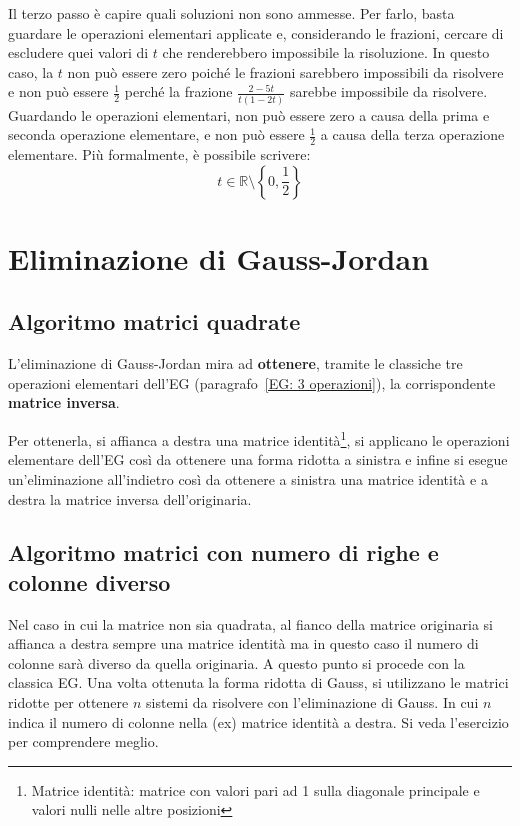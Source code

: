 \documentclass[a4paper]{article}
\begin{document}
	Il \textcolor{Red3}{terzo passo} è capire quali soluzioni non sono ammesse. Per farlo, basta guardare le operazioni elementari applicate e, considerando le frazioni, cercare di escludere quei valori di $t$ che renderebbero impossibile la risoluzione. In questo caso, la $t$ non può essere zero poiché le frazioni sarebbero impossibili da risolvere e non può essere $\frac{1}{2}$ perché la frazione $\frac{2-5t}{t\left(1-2t\right)}$ sarebbe impossibile da risolvere. Guardando le operazioni elementari, non può essere zero a causa della prima e seconda operazione elementare, e non può essere $\frac{1}{2}$ a causa della terza operazione elementare. Più formalmente, è possibile scrivere:
	\begin{equation*}
		t \in \mathbb{R} \setminus \left\{0, \dfrac{1}{2}\right\}
	\end{equation*}
	
	\newpage

	\section{Eliminazione di Gauss-Jordan}\label{Eliminazione di Gauss-Jordan}
	
	\subsection{Algoritmo matrici quadrate}
	
	L'eliminazione di Gauss-Jordan mira ad \textcolor{Red3}{\textbf{ottenere}}, tramite le classiche tre operazioni elementari dell'EG (paragrafo~\ref{EG: 3 operazioni}), la corrispondente \textcolor{Red3}{\textbf{matrice inversa}}.\newline
	
	\noindent
	Per ottenerla, si affianca a destra una matrice identità\footnote{Matrice identità: matrice con valori pari ad 1 sulla diagonale principale e valori nulli nelle altre posizioni}, si applicano le operazioni elementare dell'EG così da ottenere una forma ridotta a sinistra e infine si esegue un'eliminazione all'indietro così da ottenere a sinistra una matrice identità e a destra la matrice inversa dell'originaria.
	
	\subsection{Algoritmo matrici con numero di righe e colonne diverso}
	
	Nel caso in cui la matrice non sia quadrata, al fianco della matrice originaria si affianca a destra sempre una matrice identità ma in questo caso il numero di colonne sarà diverso da quella originaria. A questo punto si procede con la classica EG. Una volta ottenuta la forma ridotta di Gauss, si utilizzano le matrici ridotte per ottenere $n$ sistemi da risolvere con l'eliminazione di Gauss. In cui $n$ indica il numero di colonne nella (ex) matrice identità a destra. Si veda l'esercizio per comprendere meglio.
	
\end{document}

